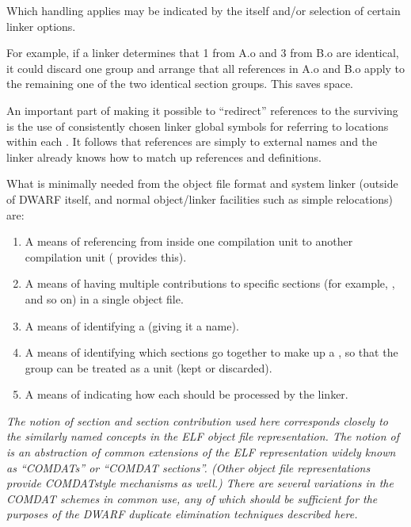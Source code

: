 Which handling applies may be indicated by the 
itself and/or selection of certain linker options.

For example, if a linker determines that 
 1
from A.o and 
 3 from B.o are identical, it could
discard one group and arrange that all references in A.o and
B.o apply to the remaining one of the two identical section
groups. This saves space.

An important part of making it possible to “redirect”
references to the surviving 
 is the use of
consistently chosen linker global symbols for referring to
locations within each 
.
It follows that references
are simply to external names and the linker already knows
how to match up references and definitions.

What is minimally needed from the object file format and system
linker (outside of DWARF itself, and normal object/linker
facilities such as simple relocations) are:

\begin{enumerate}[1.]

\item A means of referencing from inside one 
compilation unit to another 
 compilation unit
( provides this).

\item A means of having multiple contributions to specific sections
(for example, , and so on) in a single object file.

\item  A means of identifying a  (giving it a name).

\item A means of identifying which sections go together to make
up a , 
so that the group can be treated as a unit
(kept or discarded).

\item  A means of indicating how each  should be
processed by the linker.

\end{enumerate}

\textit{The notion of section and section contribution used here
corresponds closely to the similarly named concepts in the
ELF object file representation. 
The notion of  is
an abstraction of common extensions of the ELF representation
widely known as ``COMDATs'' or ``COMDAT sections''. (Other
object file representations provide COMDAT\dash style mechanisms as
well.) There are several variations in the COMDAT schemes in
common use, any of which should be sufficient for the purposes
of the 
DWARF duplicate elimination techniques described here.}

